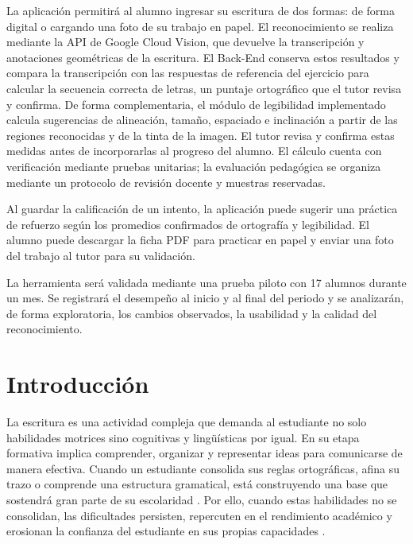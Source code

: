 \documentclass[12pt]{article}
\begin{document}
La aplicación permitirá al alumno ingresar su escritura de dos formas: de forma digital o cargando
una foto de su trabajo en papel. El reconocimiento se realiza mediante la API de Google Cloud Vision, que devuelve la transcripción y anotaciones geométricas de la escritura. El Back-End conserva estos resultados y compara la transcripción con las respuestas de referencia del ejercicio para calcular la secuencia correcta de letras, un puntaje ortográfico que el tutor revisa y confirma. De forma complementaria, el módulo de legibilidad implementado calcula sugerencias de alineación, tamaño, espaciado e inclinación a partir de las regiones reconocidas y de la tinta de la imagen. El tutor revisa y confirma estas medidas antes de incorporarlas al progreso del alumno. El cálculo cuenta con verificación mediante pruebas unitarias; la evaluación pedagógica se organiza mediante un protocolo de revisión docente y muestras reservadas.

Al guardar la calificación de un intento, la aplicación puede sugerir una práctica de refuerzo según los promedios confirmados de ortografía y legibilidad. El alumno puede descargar la ficha PDF para practicar en papel y enviar una foto del trabajo al tutor para su validación.

La herramienta será validada mediante una prueba piloto con 17 alumnos durante
un mes. Se registrará el desempeño al inicio y al final del periodo y se analizarán, de forma exploratoria,
los cambios observados, la usabilidad y la calidad del reconocimiento.

\newpage
\renewcommand{\contentsname}{Índice de contenido}
\tableofcontents

\newpage
\renewcommand{\listtablename}{Índice de tablas}
\listoftables

\newpage
\renewcommand{\listfigurename}{Índice de figuras}
\listoffigures

\newpage
{}
\section*{Introducción}

La escritura es una actividad compleja que demanda al estudiante no solo habilidades motrices sino
cognitivas y lingüísticas por igual. En su etapa formativa implica comprender, organizar y representar
ideas para comunicarse de manera efectiva. Cuando un estudiante consolida sus reglas ortográficas,
afina su trazo o comprende una estructura gramatical, está construyendo una base que sostendrá gran
parte de su escolaridad \cite{unesco2020global}. Por ello, cuando estas habilidades no se consolidan, las dificultades persisten,
repercuten en el rendimiento académico y erosionan la confianza del estudiante en sus
propias capacidades \cite{berninger2010teaching}.
\end{document}
